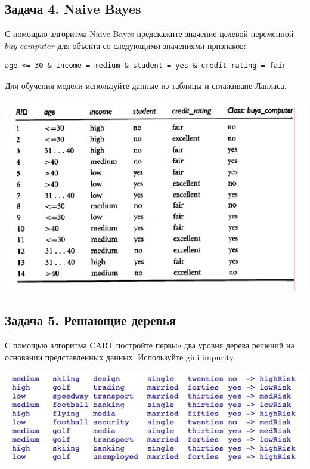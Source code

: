 \documentclass[12pt,a4paper]{article}
\begin{document}
\newpage

\subsection*{Задача 4.  Naive Bayes}

С помощью алгоритма Naive Bayes предскажите значение целевой переменной $buy\_computer$ для объекта со следующими значениями признаков:

\begin{verbatim}
age <= 30 & income = medium & student = yes & credit-rating = fair
\end{verbatim}

Для обучения модели используйте данные из таблицы и сглаживане Лапласа.

\begin{center}
\includegraphics[scale=0.8]{images/nb.png}
\end{center}

\subsection*{Задача 5.  Решающие деревья}

С помощью алгоритма CART постройте первыe два уровня дерева решений на основании представленных данных. Используйте gini impurity.

\begin{center}
\includegraphics[scale=0.8]{images/dt.png}
\end{center}
 
\end{document}
